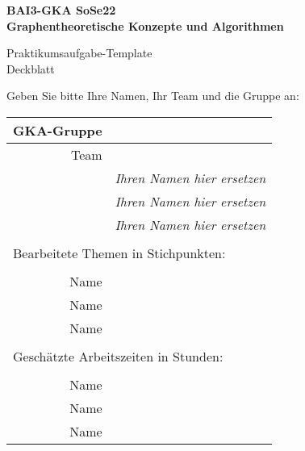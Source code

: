 

\thispagestyle{empty}
\begin{center}

    {\large {\bf   BAI3-GKA SoSe22 \\ Graphentheoretische Konzepte und Algorithmen \\[5mm]} }
    
{\huge Praktikumsaufgabe-Template  \\[5mm] Deckblatt}\\

\end{center}
Geben Sie bitte Ihre Namen, Ihr Team und die Gruppe  an:\\ 
				\begin{tabular}[t]{|r|l|}
				 \hline
				GKA-Gruppe&                 \raisebox{-3mm}{\rule[8mm]{100mm}{0mm} }\\ \hline    
				Team &                                                        \\ \hline			
				& \textit{Ihren Namen hier ersetzen }               \\ \hline    
				& \textit{Ihren Namen hier ersetzen}               \\ \hline			
				& \textit{Ihren Namen hier ersetzen  }             \\ \hline  			
				\multicolumn{2}{c}{}\\  			
				\multicolumn{2}{l}{Bearbeitete Themen in Stichpunkten:}\\			
				\multicolumn{2}{c}{}\\  \hline
				Name &                \\ \hline    
				Name&                  \\ \hline			
				Name&                \\ \hline 		
				\multicolumn{2}{c}{}\\  			
				\multicolumn{2}{l}{Geschätzte Arbeitszeiten in Stunden:}\\			
				\multicolumn{2}{c}{}\\  \hline
				Name&                 \\ \hline    
				Name&                  \\ \hline			
				Name&                \\ \hline 			
				\end{tabular}
~\\[4mm]
		
		
\vfill

